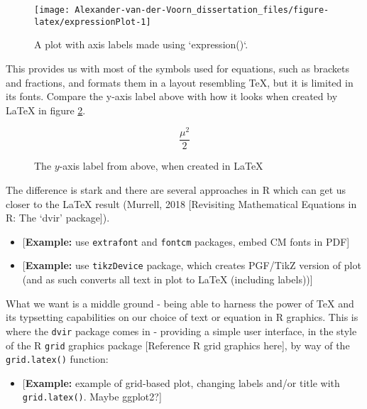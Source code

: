 \documentclass[]{article}
\providecommand{\tightlist}{%
  \setlength{\itemsep}{0pt}\setlength{\parskip}{0pt}}
\begin{document}
\begin{figure}

{\centering \texttt{[image: Alexander-van-der-Voorn\_dissertation\_files/figure-latex/expressionPlot-1]} 

}

\caption{A plot with axis labels made using `expression()`.}\label{fig:expressionPlot}
\end{figure}

This provides us with most of the symbols used for equations, such as
brackets and fractions, and formats them in a layout resembling \TeX{},
but it is limited in its fonts. Compare the y-axis label above with how
it looks when created by \LaTeX{} in figure \ref{muOver2}.

\begin{figure}\label{muOver2}
\begin{equation*}
\dfrac{\mu^2}{2}
\end{equation*}
\caption{The \(y\)-axis label from above, when created in \LaTeX}
\end{figure}

The difference is stark and there are several approaches in R which can
get us closer to the \LaTeX{} result (Murrell, 2018 {[}Revisiting
Mathematical Equations in R: The `dvir' package{]}).

\begin{itemize}
\item
  {[}\textbf{Example:} use \texttt{extrafont} and \texttt{fontcm}
  packages, embed CM fonts in PDF{]}
\item
  {[}\textbf{Example:} use \texttt{tikzDevice} package, which creates
  PGF/TikZ version of plot (and as such converts all text in plot to
  LaTeX (including labels)){]}
\end{itemize}

What we want is a middle ground - being able to harness the power of
\TeX{} and its typsetting capabilities on our choice of text or equation
in R graphics. This is where the \texttt{dvir} package comes in -
providing a simple user interface, in the style of the R \texttt{grid}
graphics package {[}Reference R grid graphics here{]}, by way of the
\texttt{grid.latex()} function:

\begin{itemize}
\tightlist
\item
  {[}\textbf{Example:} example of grid-based plot, changing labels
  and/or title with \texttt{grid.latex()}. Maybe ggplot2?{]}
\end{itemize}
\end{document}
